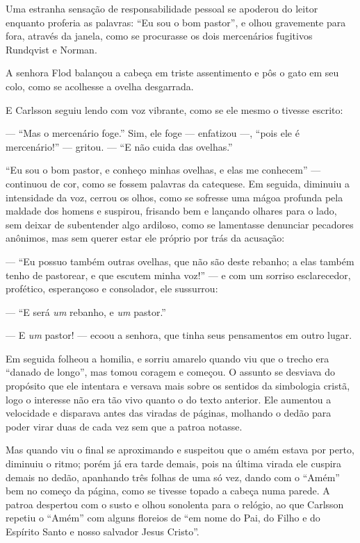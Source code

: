 Uma estranha sensação de responsabilidade pessoal se apoderou do leitor enquanto
proferia as palavras: ``Eu sou o bom pastor'', e olhou gravemente para fora,
através da janela, como se procurasse os dois mercenários fugitivos Rundqvist e
Norman.

A senhora Flod balançou a cabeça em triste assentimento e pôs o gato em seu
colo, como se acolhesse a ovelha desgarrada.

E Carlsson seguiu lendo com voz vibrante, como se ele mesmo o tivesse escrito:

--- ``Mas o mercenário foge.'' Sim, ele foge --- enfatizou ---, ``pois ele é
mercenário!'' --- gritou. --- ``E não cuida das ovelhas.''

 ``Eu sou o bom pastor, e conheço minhas ovelhas, e elas me conhecem'' ---
 continuou de cor, como se fossem palavras da catequese. Em seguida, diminuiu
 a intensidade da voz, cerrou os olhos, como se sofresse uma mágoa profunda pela
 maldade dos homens e suspirou, frisando bem e lançando olhares para o lado, sem
 deixar de subentender algo ardiloso, como se lamentasse denunciar pecadores
 anônimos, mas sem querer estar ele próprio por trás da acusação:

--- ``Eu possuo também outras ovelhas, que não são deste rebanho; a elas também
tenho de pastorear, e que escutem minha voz!'' --- e com um sorriso
esclarecedor, profético, esperançoso e consolador, ele sussurrou:

--- ``E será \textit{um} rebanho, e \textit{um} pastor.''

--- E \textit{um} pastor! --- ecoou a senhora, que tinha seus pensamentos em outro
lugar.

Em seguida folheou a homilia, e sorriu amarelo quando viu que o trecho era
``danado de longo'', mas tomou coragem e começou. O assunto se desviava do
propósito que ele intentara e versava mais sobre os sentidos da simbologia
cristã, logo o interesse não era tão vivo quanto o do texto anterior. Ele aumentou
a velocidade e disparava antes das viradas de páginas, molhando o dedão para
poder virar duas de cada vez sem que a patroa notasse.

Mas quando viu o final se aproximando e suspeitou que o amém estava por perto,
diminuiu o ritmo; porém já era tarde demais, pois na última virada ele
cuspira demais no dedão, apanhando três folhas de uma só vez, dando com o ``Amém'' bem no
começo da página, como se tivesse topado a cabeça numa parede. A patroa
despertou com o susto e olhou sonolenta para o relógio, ao que Carlsson repetiu
o ``Amém'' com alguns floreios de ``em nome do Pai, do Filho e do Espírito Santo
e nosso salvador Jesus Cristo''.

